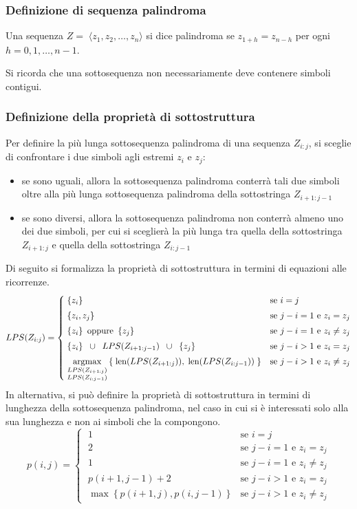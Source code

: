 \subsubsection*{Definizione di sequenza palindroma}
Una sequenza \(Z = \; \langle z_1, z_2, \dots, z_n \rangle\) si dice palindroma se \(z_{1+h} = z_{n-h}\) per ogni \(h = 0, 1, \dots, n\!-\!1\).

\noindent
Si ricorda che una sottosequenza non necessariamente deve contenere simboli contigui.

\subsubsection*{Definizione della proprietà di sottostruttura}
Per definire la più lunga sottosequenza palindroma di una sequenza \(Z_{i:j}\), si sceglie di confrontare i due simboli
agli estremi \(z_i\) e \(z_j\):
\begin{itemize}
	\item se sono uguali, allora la sottosequenza palindroma conterrà tali due simboli oltre alla più lunga sottosequenza
	palindroma della sottostringa \(Z_{i+1:j-1}\)
	\item se sono diversi, allora la sottosequenza palindroma non conterrà almeno uno dei due simboli, per cui si sceglierà
	la più lunga tra quella della sottostringa \(Z_{i+1:j}\) e quella della sottostringa \(Z_{i:j-1}\)
\end{itemize}
Di seguito si formalizza la proprietà di sottostruttura in termini di equazioni alle ricorrenze.
\[LPS(Z_{i:j}) = \begin{cases}
	\; \left\{ z_i \right\} & \text{se } i = j \\[3pt]
	\; \left\{ z_i, z_j \right\} & \text{se } j - i = 1 \text{ e } z_i = z_j \\[3pt]
	\; \left\{ z_i \right\} \text{ oppure } \left\{ z_j \right\} & \text{se } j - i = 1 \text{ e } z_i \neq z_j \\[3pt]
	\; \left\{ z_i \right\} \;\; \cup \;\; LPS(Z_{i+1:j-1}) \;\; \cup \;\; \left\{ z_j \right\} & \text{se } j-i > 1 \text{ e } z_i = z_j \\[3pt]
	\; \displaystyle \operatorname*{argmax}_{\substack{LPS(Z_{i+1:j}) \\ LPS(Z_{i:j-1})}} \left\{ \; \text{len}(LPS(Z_{i+1:j})), \; \text{len}(LPS(Z_{i:j-1})) \; \right\} & \text{se } j-i > 1 \text{ e } z_i \neq z_j
\end{cases}\]
In alternativa, si può definire la proprietà di sottostruttura in termini di lunghezza della sottosequenza palindroma,
nel caso in cui si è interessati solo alla sua lunghezza e non ai simboli che la compongono.
\[p(i, j) = \begin{cases}
	\; 1 & \text{se } i = j \\
	\; 2 & \text{se } j - i = 1 \text{ e } z_i = z_j \\
	\; 1 & \text{se } j - i = 1 \text{ e } z_i \neq z_j \\
	\; p(i+1, j-1) + 2 & \text{se } j-i > 1 \text{ e } z_i = z_j \\
	\; \displaystyle \max \left\{ p(i+1, j), p(i, j-1) \right\} & \text{se } j-i > 1 \text{ e } z_i \neq z_j
\end{cases}\]

